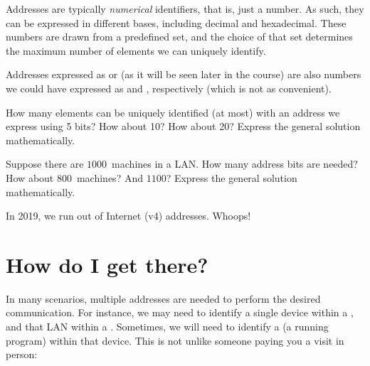 Addresses are typically \textit{numerical} identifiers, that is, just a number.
As such, they can be expressed in different bases, including decimal and hexadecimal.
These numbers are drawn from a predefined set, and the choice of that set
determines the maximum number of elements we can uniquely identify.

\begin{remark}
Addresses expressed as  or  
(as it will be seen later in the course) are also numbers we could have expressed 
as  and , respectively
(which is not as convenient).
\end{remark}

\begin{exercise}
How many elements can be uniquely identified (at most) with an address we express 
using 5 bits? How about 10? How about 20? Express the general solution mathematically.
\end{exercise}

\begin{exercise}
Suppose there are $1000$~machines in a LAN. How many address bits are needed?
How about $800$~machines? And $1100$? Express the general solution mathematically.
\end{exercise} 

\begin{remark}
In 2019, we run out of Internet (v4) addresses. Whoops!
\end{remark}

\section{How do I get there?}\label{sec:where:route}

In many scenarios, multiple addresses are needed to perform the desired 
 communication. For instance, we may need to identify
a single device within a , and that LAN within a . Sometimes, we will need 
to identify a  (a running program) within that device. 
This is not unlike someone paying you a visit in person:

